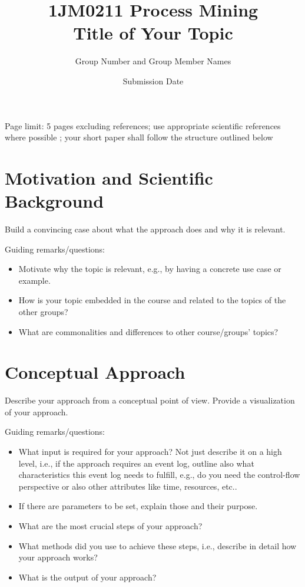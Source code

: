 \documentclass{article}
\title{1JM0211 Process Mining \\Title of Your Topic}
\author{Group Number and Group Member Names}
\date{Submission Date}
\begin{document}
\pagestyle{empty}
\let\svmaketitle\maketitle
\def\maketitle{\svmaketitle\thispagestyle{empty}}
\maketitle

\begin{mybox}[frametitle = Remarks (to be removed upon submission)]
Page limit: 5 pages excluding references; use appropriate scientific references where possible \cite{DBLP:books/sp/Aalst16}; your short paper shall follow the structure outlined below
\end{mybox}


\section{Motivation and Scientific Background}\label{sec:motivation}
Build a convincing case about what the approach does and why it is relevant.

Guiding remarks/questions:
\begin{itemize}
    \item Motivate why the topic is relevant, e.g., by having a concrete use case or example. 
    \item How is your topic embedded in the course and related to the topics of the other groups?
    \item What are commonalities and differences to other course/groups' topics?
\end{itemize}


\section{Conceptual Approach}\label{sec:conceptual_approach}
Describe your approach from a conceptual point of view. Provide a visualization of your approach.

Guiding remarks/questions:
\begin{itemize}
    \item What input is required for your approach? Not just describe it on a high level, i.e., if the approach requires an event log, outline also what characteristics this event log needs to fulfill, e.g., do you need the control-flow perspective or also other attributes like time, resources, etc..
    \item If there are parameters to be set, explain those and their purpose.
    \item What are the most crucial steps of your approach?
    \item What methods did you use to achieve these steps, i.e., describe in detail how your approach works?
    \item What is the output of your approach?
\end{itemize}
\end{document}

